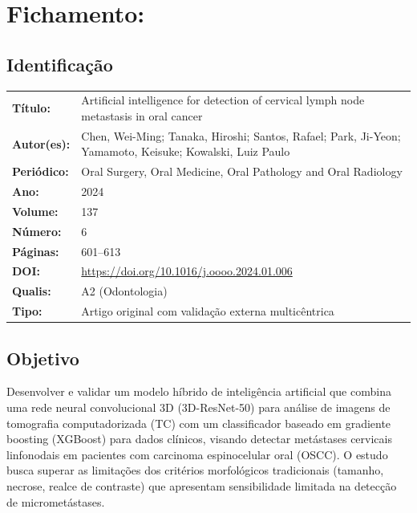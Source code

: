 \section{Fichamento: }

\subsection{Identificação}
\begin{tabular}{ll}
\textbf{Título:} & Artificial intelligence for detection of cervical lymph
node metastasis in oral cancer \\
\textbf{Autor(es):} & Chen, Wei-Ming; Tanaka, Hiroshi; Santos, Rafael;
Park, Ji-Yeon; Yamamoto, Keisuke; Kowalski, Luiz Paulo \\
\textbf{Periódico:} & Oral Surgery, Oral Medicine, Oral Pathology and Oral Radiology \\
\textbf{Ano:} & 2024 \\
\textbf{Volume:} & 137 \\
\textbf{Número:} & 6 \\
\textbf{Páginas:} & 601--613 \\
\textbf{DOI:} & \url{https://doi.org/10.1016/j.oooo.2024.01.006} \\
\textbf{Qualis:} & A2 (Odontologia) \\
\textbf{Tipo:} & Artigo original com validação externa multicêntrica \\
\end{tabular}

\subsection{Objetivo}
Desenvolver e validar um modelo híbrido de inteligência artificial que
combina uma rede neural convolucional 3D (3D-ResNet-50) para análise de
imagens de tomografia computadorizada (TC) com um classificador baseado
em gradiente boosting (XGBoost) para dados clínicos, visando detectar
metástases cervicais linfonodais em pacientes com carcinoma espinocelular
oral (OSCC). O estudo busca superar as limitações dos critérios
morfológicos tradicionais (tamanho, necrose, realce de contraste) que
apresentam sensibilidade limitada na detecção de micrometástases.

